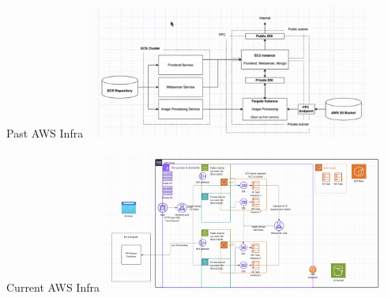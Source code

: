 \begin{frame}{Past AWS Infra}
    \centering
    \includegraphics[height=0.7\textheight,width=0.7\textwidth,keepaspectratio]{images/full-mm-infra.png}
\end{frame}

\begin{frame}{Current AWS Infra}
  \centering
  \includegraphics[height=0.7\textheight,width=0.7\textwidth,keepaspectratio]{images/MMICT-ALB-Cloud.png}
\end{frame}

